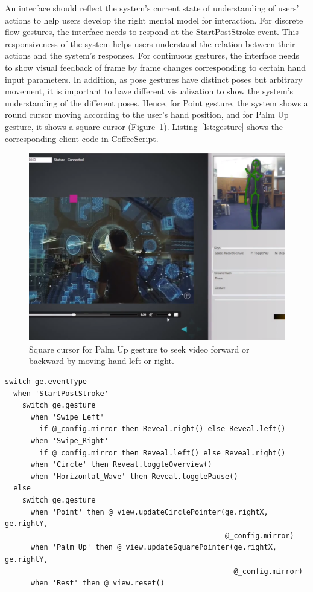 An interface
should reflect the system's current state of understanding of users'
actions to help users develop the right mental model for interaction. For
discrete flow gestures, the interface needs to respond at the StartPostStroke
event. This responsiveness of the system helps users understand the relation
between their actions and the system's responses. For continuous gestures, the
interface needs to show visual feedback of frame by frame changes
corresponding to certain hand input parameters. In addition, as pose gestures
have distinct poses but arbitrary movement, it is important to have different 
visualization to show the system's understanding of the different
poses. Hence, for Point gesture, the system shows a round cursor moving
according to the user's hand position, and for Palm Up gesture, it shows a
square cursor (Figure~\ref{fig:palm-up}).
Listing~\ref{lst:gesture} shows the corresponding client code in CoffeeScript.

\begin{figure}[tbh]
\centering
\includegraphics[trim=0 2.7cm 0 0,
clip, width=\columnwidth]{figures/video_control.PNG}
\caption{Square cursor for Palm Up gesture to seek video forward or backward by
moving hand left or right.}
\label{fig:palm-up}
\end{figure}

\begin{lstlisting}[caption={Client code mapping gesture events to actions in
CoffeeScript.}, label={lst:client-code}] 
switch ge.eventType
  when 'StartPostStroke'
    switch ge.gesture
      when 'Swipe_Left'
        if @_config.mirror then Reveal.right() else Reveal.left()
      when 'Swipe_Right'
        if @_config.mirror then Reveal.left() else Reveal.right()
      when 'Circle' then Reveal.toggleOverview()
      when 'Horizontal_Wave' then Reveal.togglePause()
  else
    switch ge.gesture
      when 'Point' then @_view.updateCirclePointer(ge.rightX, ge.rightY,
                                                   @_config.mirror)
      when 'Palm_Up' then @_view.updateSquarePointer(ge.rightX, ge.rightY,
                                                     @_config.mirror)
      when 'Rest' then @_view.reset()
\end{lstlisting}

